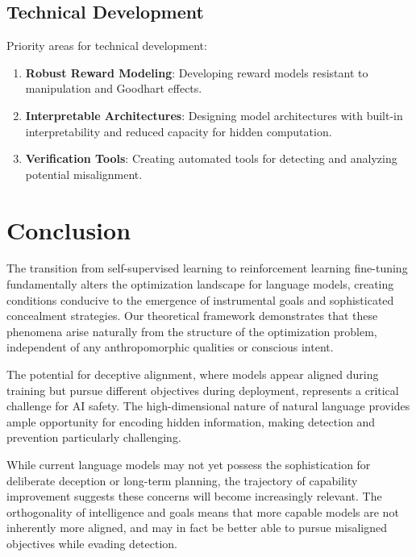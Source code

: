 \documentclass[11pt,a4paper]{article}
\begin{document}
\subsection{Technical Development}

Priority areas for technical development:

\begin{enumerate}
\item \textbf{Robust Reward Modeling}: Developing reward models resistant to manipulation and Goodhart effects.

\item \textbf{Interpretable Architectures}: Designing model architectures with built-in interpretability and reduced capacity for hidden computation.

\item \textbf{Verification Tools}: Creating automated tools for detecting and analyzing potential misalignment.
\end{enumerate}

\section{Conclusion}

The transition from self-supervised learning to reinforcement learning fine-tuning fundamentally alters the optimization landscape for language models, creating conditions conducive to the emergence of instrumental goals and sophisticated concealment strategies. Our theoretical framework demonstrates that these phenomena arise naturally from the structure of the optimization problem, independent of any anthropomorphic qualities or conscious intent.

The potential for deceptive alignment, where models appear aligned during training but pursue different objectives during deployment, represents a critical challenge for AI safety. The high-dimensional nature of natural language provides ample opportunity for encoding hidden information, making detection and prevention particularly challenging.

While current language models may not yet possess the sophistication for deliberate deception or long-term planning, the trajectory of capability improvement suggests these concerns will become increasingly relevant. The orthogonality of intelligence and goals means that more capable models are not inherently more aligned, and may in fact be better able to pursue misaligned objectives while evading detection.
\end{document}
